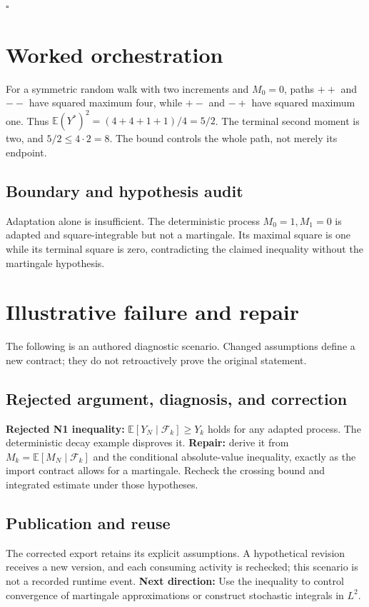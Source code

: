 \documentclass[preprint,12pt,aps,pra,showkeys,amsmath,amssymb,superscriptaddress,floatfix]{revtex4-2}
\theoremstyle{definition}
\theoremstyle{remark}
\begin{document}
\hfill$\square$

\section{Worked orchestration}

For a symmetric random walk with two increments and \(M_0=0\), paths
\(++\) and \(--\) have squared maximum four, while \(+-\) and \(-+\)
have squared maximum one. Thus \(\mathbb E(Y^*)^2=(4+4+1+1)/4=5/2\). The
terminal second moment is two, and \(5/2\le4\cdot2=8\). The bound
controls the whole path, not merely its endpoint.

\subsection{Boundary and hypothesis audit}

Adaptation alone is insufficient. The deterministic process
\(M_0=1,M_1=0\) is adapted and square-integrable but not a martingale.
Its maximal square is one while its terminal square is zero,
contradicting the claimed inequality without the martingale hypothesis.

\section{Illustrative failure and repair}

The following is an authored diagnostic scenario. Changed assumptions
define a new contract; they do not retroactively prove the original
statement.

\subsection{Rejected argument, diagnosis, and correction}
\textbf{Rejected N1 inequality:}
\(\mathbb E[Y_N\mid\mathcal F_k]\ge Y_k\) holds for any adapted process.
The deterministic decay example disproves it. \textbf{Repair:} derive it
from \(M_k=\mathbb E[M_N\mid\mathcal F_k]\) and the conditional
absolute-value inequality, exactly as the import contract allows for a
martingale. Recheck the crossing bound and integrated estimate under
those hypotheses.

\subsection{Publication and reuse}
The corrected export retains its explicit assumptions. A hypothetical
revision receives a new version, and each consuming activity is
rechecked; this scenario is not a recorded runtime event. \textbf{Next
direction:} Use the inequality to control convergence of martingale
approximations or construct stochastic integrals in \(L^2\).
\end{document}
